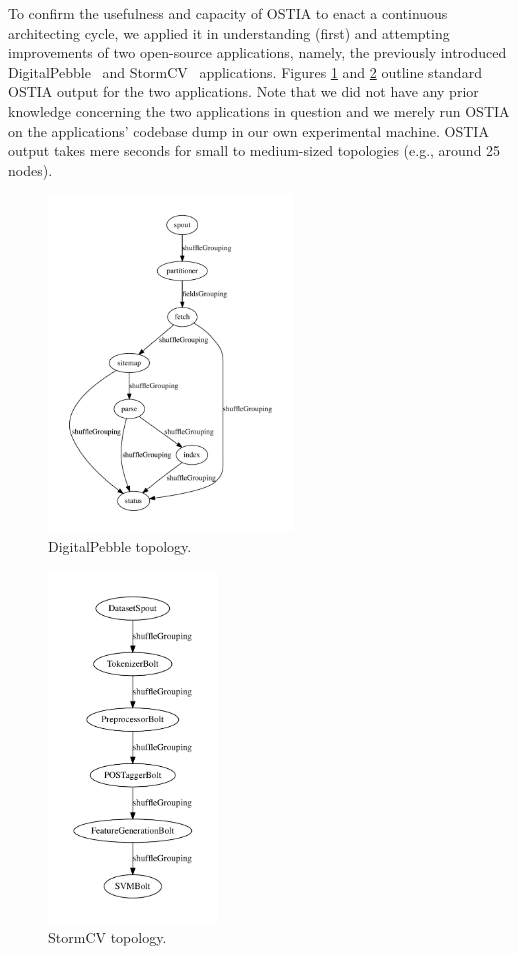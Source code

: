 To confirm the usefulness and capacity of OSTIA to enact a continuous
architecting cycle, we applied it in understanding (first) and attempting
improvements of two open-source applications, namely, the previously introduced
DigitalPebble~\cite{digitalpebble} and 
StormCV~\cite{stormCV}
applications. Figures \ref{dp} and \ref{scv} outline standard OSTIA output for the two applications. Note that we did not have any prior knowledge concerning the two applications in question and we merely run OSTIA on the applications' codebase dump in our own experimental machine. OSTIA output takes mere seconds for small to medium-sized topologies (e.g., around 25 nodes).
%
\begin{figure}
\begin{center}
\includegraphics[width=6.5cm]{images/output/crawl}
		\caption{DigitalPebble topology.}
		\label{dp}
		\end{center}
\end{figure}
\begin{figure}
\begin{center}
\includegraphics[width=4.5cm]{images/output/senti_storm}
		\caption{StormCV topology.}
		\label{scv}
		\end{center}
\end{figure}
